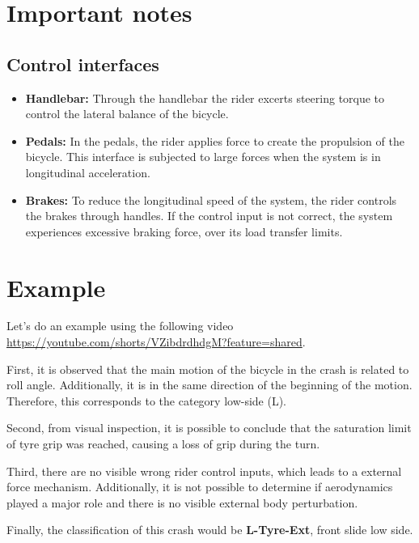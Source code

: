 \documentclass{article}
\begin{document}
\section{Important notes}


\subsection{Control interfaces}

\begin{itemize}
    \item \textbf{Handlebar:} Through the handlebar the rider excerts steering torque to control the lateral balance of the bicycle.
    \item \textbf{Pedals:} In the pedals, the rider applies force to create the propulsion of the bicycle.
        This interface is subjected to large forces when the system is in longitudinal acceleration.
    \item \textbf{Brakes:} To reduce the longitudinal speed of the system, the rider controls the brakes through handles.
        If the control input is not correct, the system experiences excessive braking force, over its load transfer limits.
\end{itemize}



\section{Example}

Let's do an example using the following video \url{https://youtube.com/shorts/VZibdrdhdgM?feature=shared}.

First, it is observed that the main motion of the bicycle in the crash is related to roll angle.
%
Additionally, it is in the same direction of the beginning of the motion.
%
Therefore, this corresponds to the category low-side (L).


Second, from visual inspection, it is possible to conclude that the saturation limit of tyre grip was reached, causing a loss of grip during the turn.


Third, there are no visible wrong rider control inputs, which leads to a external force mechanism.
%
Additionally, it is not possible to determine if aerodynamics played a major role and there is no visible external body perturbation.


Finally, the classification of this crash would be \textbf{L-Tyre-Ext}, front slide low side.
\end{document}
